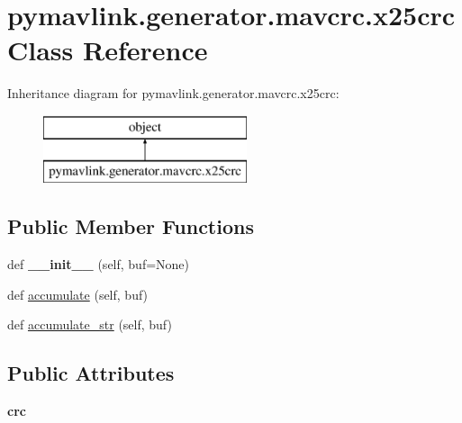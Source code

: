 \hypertarget{classpymavlink_1_1generator_1_1mavcrc_1_1x25crc}{}\section{pymavlink.\+generator.\+mavcrc.\+x25crc Class Reference}
\label{classpymavlink_1_1generator_1_1mavcrc_1_1x25crc}
Inheritance diagram for pymavlink.\+generator.\+mavcrc.\+x25crc\+:\begin{figure}[H]
\begin{center}
\leavevmode
\includegraphics[height=2.000000cm]{classpymavlink_1_1generator_1_1mavcrc_1_1x25crc}
\end{center}
\end{figure}
\subsection*{Public Member Functions}
\begin{DoxyCompactItemize}
\item 
\mbox{\label{classpymavlink_1_1generator_1_1mavcrc_1_1x25crc_ad5f749f0713c4fe42e5bca6eddda7346}} 
def {\bfseries \+\_\+\+\_\+init\+\_\+\+\_\+} (self, buf=None)
\item 
def \hyperlink{classpymavlink_1_1generator_1_1mavcrc_1_1x25crc_ae5f82c53cc694c92a3f612e06e259ae6}{accumulate} (self, buf)
\item 
def \hyperlink{classpymavlink_1_1generator_1_1mavcrc_1_1x25crc_a47f2140fb2e08dae2f4315c86f5c2216}{accumulate\+\_\+str} (self, buf)
\end{DoxyCompactItemize}
\subsection*{Public Attributes}
\begin{DoxyCompactItemize}
\item 
\mbox{\label{classpymavlink_1_1generator_1_1mavcrc_1_1x25crc_a231ac18f30e05e9a81d95534925a318b}} 
{\bfseries crc}
\end{DoxyCompactItemize}


